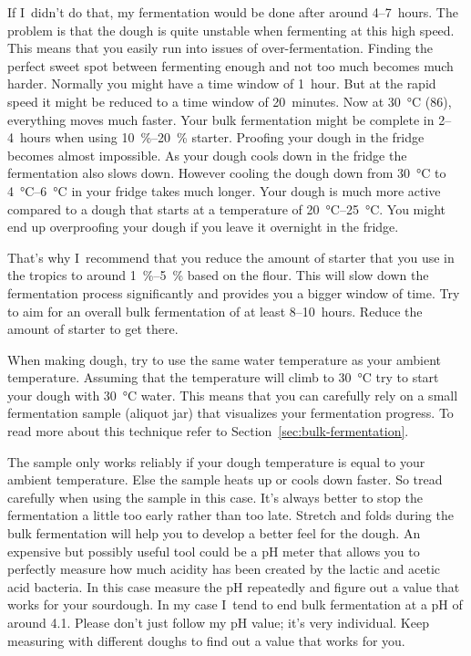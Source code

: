 If I~didn't do that, my fermentation would be done after
around 4--7~hours. The problem is that the dough is quite
unstable when fermenting at this high speed. This means
that you easily run into issues of over-fermentation.
Finding the perfect sweet spot between fermenting enough
and not too much becomes much harder. Normally you might
have a time window of 1~hour. But at the rapid speed it
might be reduced to a time window of 20~minutes. Now at
\qty{30}{\degreeCelsius} (\qty{86}{\degF}), everything moves much faster. Your
bulk fermentation might be complete in 2--4~hours when using
\qtyrange{10}{20}{\percent} starter. Proofing your dough in the fridge becomes
almost impossible. As your dough cools down in the fridge the fermentation
also slows down. However cooling the dough down from \qty{30}{\degreeCelsius}
to \qtyrange{4}{6}{\degreeCelsius} in your fridge takes much longer. Your
dough is much more active compared to a dough that starts at a temperature of
\qtyrange{20}{25}{\degreeCelsius}. You might end up overproofing your dough if
you leave it overnight in the fridge.

That's why I~recommend that you reduce the amount of starter
that you use in the tropics to around \qtyrange{1}{5}{\percent}
based on the flour. This will slow down the fermentation
process significantly and provides you a bigger window
of time. Try to aim for an overall bulk fermentation of at
least 8--10~hours. Reduce the amount of starter to get there.

When making dough, try to use the same water temperature
as your ambient temperature. Assuming that the temperature
will climb to \qty{30}{\degreeCelsius} try to start your dough
with \qty{30}{\degreeCelsius} water. This means that you can carefully rely on
a small fermentation sample (aliquot jar) that visualizes your fermentation
progress. To read more about this technique refer
to Section~\ref{sec:bulk-fermentation}.

The sample only works reliably if your dough temperature
is equal to your ambient temperature. Else the sample heats
up or cools down faster. So tread carefully when using
the sample in this case. It's always better to stop
the fermentation a little too early rather than too late.
Stretch and folds during the bulk fermentation
will help you to develop a better feel for
the dough. An expensive but possibly useful tool
could be a pH meter that allows you to perfectly
measure how much acidity has been created by the
lactic and acetic acid bacteria. In this case measure
the pH repeatedly and figure out a value that works
for your sourdough. In my case I~tend to end bulk
fermentation at a pH of around 4.1. Please don't just
follow my pH value; it's very individual. Keep measuring
with different doughs to find out a value that works for you.

